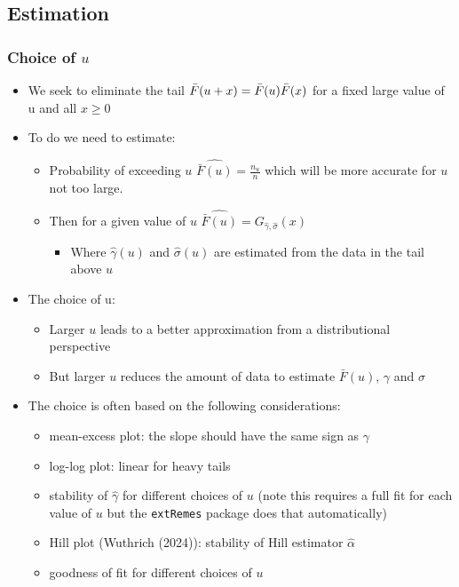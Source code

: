 \documentclass{article}
\begin{document}
\subsection{Estimation}

\subsubsection{Choice of $u$}
\begin{itemize}
    \item We seek to eliminate the tail $\Bar{F}(u + x) = \Bar{F}(u) \Bar{F}(x)$ for a fixed large value of u and all $x \geq 0$
    \item To do we need to estimate:
    \begin{itemize}
        \item Probability of exceeding $u$ $\widehat{\bar{F}(u)} = \frac{n_u}{n}$ which will be more accurate for $u$ not too large.
        \item Then for a given value of $u$ $\widehat{\bar{F}(u)} = G_{\hat{\gamma}, \hat{\sigma}}(x)$ 
        \begin{itemize}
            \item Where $\hat{\gamma}(u)$ and $\hat{\sigma}(u)$ are estimated from the data in the tail above $u$
        \end{itemize}
    \end{itemize}
    \item The choice of u:
    \begin{itemize}
        \item Larger $u$ leads to a better approximation from a distributional perspective
        \item But larger $u$ reduces the amount of data to estimate $\bar{F}(u)$, $\gamma$ and $\sigma$
    \end{itemize}    
    \item The choice is often based on the following considerations:
    \begin{itemize}
        \item mean-excess plot: the slope should have the same sign as $\gamma$
        \item log-log plot: linear for heavy tails
        \item stability of $\hat{\gamma}$ for different choices of $u$ (note this requires a full fit for each value of $u$ but the \texttt{extRemes} package does that automatically)
        \item Hill plot (Wuthrich (2024)): stability of Hill estimator $\hat{\alpha}$
        \item goodness of fit for different choices of $u$
    \end{itemize}

    
\end{itemize}
\end{document}
